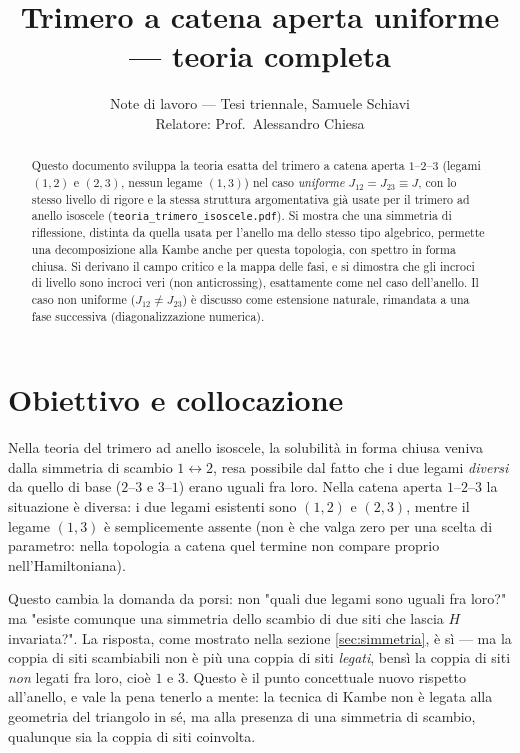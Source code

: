 \documentclass[11pt,a4paper]{article}
\title{Trimero a catena aperta uniforme — teoria completa}
\author{Note di lavoro — Tesi triennale, Samuele Schiavi\\ Relatore: Prof.\ Alessandro Chiesa}
\date{}
\begin{document}
\maketitle

\begin{abstract}
\noindent
Questo documento sviluppa la teoria esatta del trimero a catena aperta
$1$--$2$--$3$ (legami $(1,2)$ e $(2,3)$, nessun legame $(1,3)$) nel caso
\emph{uniforme} $J_{12}=J_{23}\equiv J$, con lo stesso livello di rigore e
la stessa struttura argomentativa già usate per il trimero ad anello
isoscele (\texttt{teoria\_trimero\_isoscele.pdf}). Si mostra che una
simmetria di riflessione, distinta da quella usata per l'anello ma dello
stesso tipo algebrico, permette una decomposizione alla Kambe anche per
questa topologia, con spettro in forma chiusa. Si derivano il campo
critico e la mappa delle fasi, e si dimostra che gli incroci di livello
sono incroci veri (non anticrossing), esattamente come nel caso dell'anello.
Il caso non uniforme ($J_{12}\neq J_{23}$) è discusso come estensione
naturale, rimandata a una fase successiva (diagonalizzazione numerica).
\end{abstract}

\section{Obiettivo e collocazione}

Nella teoria del trimero ad anello isoscele, la solubilità in forma chiusa
veniva dalla simmetria di scambio $1\leftrightarrow2$, resa possibile dal
fatto che i due legami \emph{diversi} da quello di base ($2$--$3$ e
$3$--$1$) erano uguali fra loro. Nella catena aperta $1$--$2$--$3$ la
situazione è diversa: i due legami esistenti sono $(1,2)$ e $(2,3)$, mentre
il legame $(1,3)$ è semplicemente assente (non è che valga zero per una
scelta di parametro: nella topologia a catena quel termine non compare
proprio nell'Hamiltoniana).

Questo cambia la domanda da porsi: non "quali due legami sono uguali fra
loro?" ma "esiste comunque una simmetria dello scambio di due siti che
lascia $H$ invariata?". La risposta, come mostrato nella sezione
\ref{sec:simmetria}, è sì — ma la coppia di siti scambiabili non è più una
coppia di siti \emph{legati}, bensì la coppia di siti \emph{non} legati fra
loro, cioè $1$ e $3$. Questo è il punto concettuale nuovo rispetto
all'anello, e vale la pena tenerlo a mente: la tecnica di Kambe non è legata
alla geometria del triangolo in sé, ma alla presenza di una simmetria di
scambio, qualunque sia la coppia di siti coinvolta.
\end{document}
